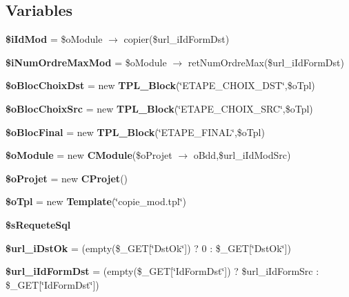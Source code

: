 \subsection*{Variables}
\begin{CompactItemize}
\item 
\textbf{\$iIdMod} = \$oModule $\rightarrow$ copier(\$url\_\-iIdFormDst)\label{copie__mod_8php_9572be7281db5b7af02ded5a9a47e2b1}

\item 
\textbf{\$iNumOrdreMaxMod} = \$oModule $\rightarrow$ retNumOrdreMax(\$url\_\-iIdFormDst)\label{copie__mod_8php_abd35648076407e706d40892ea7172a1}

\item 
\textbf{\$oBlocChoixDst} = new {\bf TPL\_\-Block}(\char`\"{}ETAPE\_\-CHOIX\_\-DST\char`\"{},\$oTpl)\label{copie__mod_8php_a0f1cd44252709be7ca4d43a533220de}

\item 
\textbf{\$oBlocChoixSrc} = new {\bf TPL\_\-Block}(\char`\"{}ETAPE\_\-CHOIX\_\-SRC\char`\"{},\$oTpl)\label{copie__mod_8php_4cecff766c78bea7967c9c00a8fde40d}

\item 
\textbf{\$oBlocFinal} = new {\bf TPL\_\-Block}(\char`\"{}ETAPE\_\-FINAL\char`\"{},\$oTpl)\label{copie__mod_8php_0404b3d41507482ec262c7e0605fab5e}

\item 
\textbf{\$oModule} = new {\bf CModule}(\$oProjet $\rightarrow$ oBdd,\$url\_\-iIdModSrc)\label{copie__mod_8php_659cdbae85c53cc89808c9ff105614ad}

\item 
\textbf{\$oProjet} = new {\bf CProjet}()\label{copie__mod_8php_ec412e7ac901485e72b77d2185159421}

\item 
\textbf{\$oTpl} = new {\bf Template}(\char`\"{}copie\_\-mod.tpl\char`\"{})\label{copie__mod_8php_7de57ba665b7c068e98ea46469be2865}

\item 
\textbf{\$sRequeteSql}
\item 
\textbf{\$url\_\-iDstOk} = (empty(\$\_\-GET[\char`\"{}DstOk\char`\"{}]) ? 0 : \$\_\-GET[\char`\"{}DstOk\char`\"{}])\label{copie__mod_8php_42d909467c92be850ded5265fb08476f}

\item 
\textbf{\$url\_\-iIdFormDst} = (empty(\$\_\-GET[\char`\"{}IdFormDst\char`\"{}]) ? \$url\_\-iIdFormSrc : \$\_\-GET[\char`\"{}IdFormDst\char`\"{}])\label{copie__mod_8php_567046dac06231cd778843179645aac5}


\end{CompactItemize}
